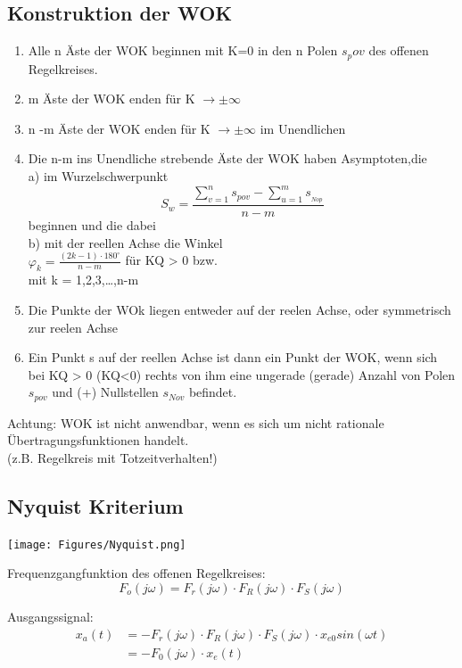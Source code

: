 \documentclass[10pt,a4paper]{article}
\begin{document}
\subsection{Konstruktion der WOK}
\begin{mdframed}[style=exercise]
	\begin{enumerate}[leftmargin=*]
		\item Alle n Äste der WOK beginnen mit K=0 in den n Polen $s_pov$ des offenen Regelkreises.
		\item m Äste der WOK enden für K $\rightarrow \pm \infty$
		\item n -m Äste der WOK enden für K $\rightarrow \pm \infty$ im Unendlichen
		\item Die n-m ins Unendliche strebende Äste der WOK haben Asymptoten,die\\
		      a) im Wurzelschwerpunkt
		      \[S_{w}=\frac{\sum_{v=1}^{n} s_{pov}-\sum_{u=1}^{m} s_{_{Nop}}}{n-m}\]
		      beginnen und die dabei\\
		      b) mit der reellen Achse die Winkel\\
		      $\varphi_{k}=\frac{(2 k-1) \cdot 180^{\circ}}{n-m}$ für KQ > 0 bzw.\\
		      mit k = 1,2,3,\dots,n-m
		\item Die Punkte der WOk liegen entweder auf der reelen Achse, oder symmetrisch zur reelen Achse
		\item Ein Punkt s auf der reellen Achse ist dann ein Punkt der WOK, wenn sich bei KQ > 0 (KQ<0)
		      rechts von ihm eine ungerade (gerade) Anzahl von Polen $s_{pov}$ und (+) Nullstellen $s_{Nov}$ befindet.
	\end{enumerate}

	Achtung: WOK ist nicht anwendbar, wenn es sich um nicht rationale
	Übertragungsfunktionen handelt.\\ (z.B. Regelkreis mit Totzeitverhalten!)
\end{mdframed}

\subsection{Nyquist Kriterium}
\begin{center}
	\texttt{[image: Figures/Nyquist.png]}
\end{center}
Frequenzgangfunktion des offenen Regelkreises:
\[
	F_o (j\omega) = F_r (j\omega) \cdot F_R (j\omega) \cdot F_S (j\omega)
\]

Ausgangssignal:
\begin{align*}
	x_a(t) & =-F_r (j\omega) \cdot F_R (j\omega) \cdot F_S (j\omega) \cdot
	x_{e0}sin(\omega t)                                                    \\
	       & = -F_0 (j\omega) \cdot x_e (t)
\end{align*}
\end{document}
